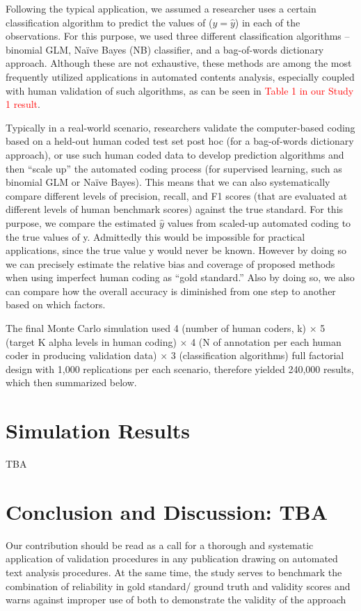 \documentclass[man, 12pt, a4paper, nolmodern, noextraspace]{apa6}
\begin{document}
    Following the typical application, we assumed a researcher uses a certain classification algorithm to predict the values of ($y = \hat{y}$) in each of the observations. For this purpose, we used three different classification algorithms – binomial GLM, Naïve Bayes (NB) classifier, and a bag-of-words dictionary approach. Although these are not exhaustive, these methods are among the most frequently utilized applications in automated contents analysis, especially coupled with human validation of such algorithms, as can be seen in \textcolor{red}{Table 1 in our Study 1 result}. 
    
    Typically in a real-world scenario, researchers validate the computer-based coding based on a held-out human coded test set post hoc (for a bag-of-words dictionary approach), or use such human coded data to develop prediction algorithms and then “scale up” the automated coding process (for supervised learning, such as binomial GLM or Naïve Bayes). This means that we can also systematically compare different levels of precision, recall, and F1 scores (that are evaluated at different levels of human benchmark scores) against the true standard. For this purpose, we compare the estimated $\hat{y}$ values from scaled-up automated coding to the true values of y. Admittedly this would be impossible for practical applications, since the true value y would never be known. However by doing so we can precisely estimate the relative bias and coverage of proposed methods when using imperfect human coding as \enquote{gold standard.} Also by doing so, we also can compare how the overall accuracy is diminished from one step to another based on which factors. 
    
    The final Monte Carlo simulation used 4 (number of human coders, k) $\times$ 5 (target K alpha levels in human coding) $\times$ 4 (N of annotation per each human coder in producing validation data) $\times$ 3 (classification algorithms) full factorial design with 1,000 replications per each scenario, therefore yielded 240,000 results, which then summarized below.
    
\section{Simulation Results}

TBA

\section{Conclusion and Discussion: TBA}

    Our contribution should be read as a call for a thorough and systematic application of validation procedures in any publication drawing on automated text analysis procedures. At the same time, the study serves to benchmark the combination of reliability in gold standard/ ground truth and validity scores and warns against improper use of both to demonstrate the validity of the approach
    
\printbibliography
\end{document}
